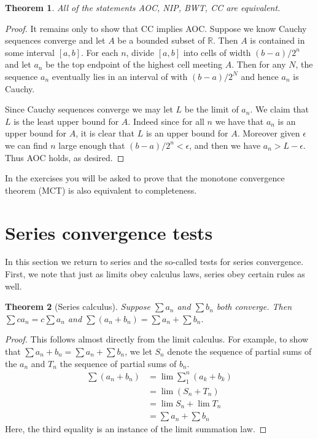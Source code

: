 \documentclass[11pt,oneside]{amsbook}
\newcommand{\RR}{\mathbb R}
\theoremstyle{definition}
\theoremstyle{plain}
\newtheorem{thm}{Theorem}[section]
\theoremstyle{definition}
\theoremstyle{remark}
\numberwithin{equation}{section}
\numberwithin{figure}{section}
\begin{document}
\begin{thm}
  All of the statements AOC, NIP, BWT, CC are equivalent.
\end{thm}

\begin{proof}
  It remains only to show that CC implies AOC. Suppose we know Cauchy sequences converge and let $A$ be a bounded subset of $\RR$. Then $A$ is contained in some interval $[a,b]$. For each $n$, divide $[a,b]$ into cells of width $(b-a)/2^n$ and let $a_n$ be the top endpoint of the highest cell meeting $A$. Then for any $N$, the sequence $a_n$ eventually lies in an interval of with $(b-a)/2^N$ and hence $a_n$ is Cauchy.

  Since Cauchy sequences converge we may let $L$ be the limit of $a_n$. We claim that $L$ is the least upper bound for $A$. Indeed since for all $n$ we have that $a_n$ is an upper bound for $A$, it is clear that $L$ is an upper bound for $A$. Moreover given $\epsilon$ we can find $n$ large enough that $(b-a)/2^n<\epsilon$, and then we have $a_n>L-\epsilon$. Thus AOC holds, as desired.
\end{proof}

In the exercises you will be asked to prove that the monotone convergence theorem (MCT) is also equivalent to completeness.

\newpage
\section{Series convergence tests}

In this section we return to series and the so-called tests for series convergence. First, we note that just as limits obey calculus laws, series obey certain rules as well.

\begin{thm}[Series calculus]
  Suppose $\sum a_n$ and $\sum b_n$ both converge. Then $\sum ca_n=c\sum a_n$ and $\sum(a_n+b_n)=\sum a_n+\sum b_n$.
\end{thm}

\begin{proof}
  This follows almost directly from the limit calculus. For example, to show that $\sum a_n+b_n=\sum a_n+\sum b_n$, we let $S_n$ denote the sequence of partial sums of the $a_n$ and $T_n$ the sequence of partial sums of $b_n$.
  \begin{align*}
    \sum(a_n+b_n)&=\lim\sum_1^n(a_k+b_k)\\
                &=\lim (S_n+T_n)\\
                &=\lim S_n+\lim T_n\\
                &=\sum a_n+\sum b_n
  \end{align*}
  Here, the third equality is an instance of the limit summation law.
\end{proof}
\end{document}
